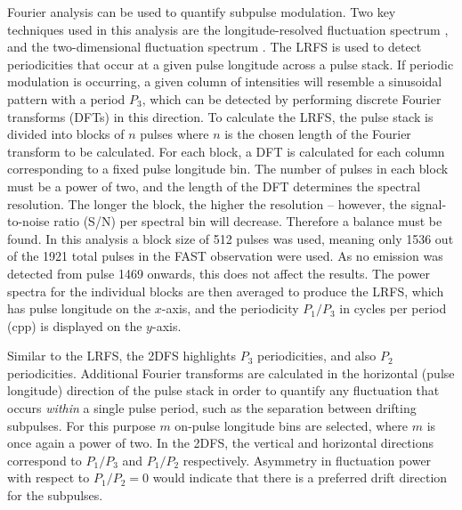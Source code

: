 Fourier analysis can be used to quantify subpulse modulation. Two key techniques used in this analysis are the longitude-resolved fluctuation spectrum \citep[LRFS;][]{Bxxx1970a}, and the two-dimensional fluctuation spectrum \citep[2DFS;][]{ESxx2002}. The LRFS is used to detect periodicities that occur at a given pulse longitude across a pulse stack. If periodic modulation is occurring, a given column of intensities will resemble a sinusoidal pattern with a period $P_3$, which can be detected by performing discrete Fourier transforms (DFTs) in this direction. To calculate the LRFS, the pulse stack is divided into blocks of $n$ pulses where $n$ is the chosen length of the Fourier transform to be calculated. For each block, a DFT is calculated for each column corresponding to a fixed pulse longitude bin. The number of pulses in each block must be a power of two, and the length of the DFT determines the spectral resolution. The longer the block, the higher the resolution -- however, the signal-to-noise ratio (S/N) per spectral bin will decrease. Therefore a balance must be found. In this analysis a block size of 512 pulses was used, meaning only 1536 out of the 1921 total pulses in the FAST observation were used. As no emission was detected from pulse 1469 onwards, this does not affect the results. The power spectra for the individual blocks are then averaged to produce the LRFS, which has pulse longitude on the $x$-axis, and the periodicity $P_1/P_3$ in cycles per period (cpp) is displayed on the $y$-axis. 

Similar to the LRFS, the 2DFS highlights $P_3$ periodicities, and also $P_2$ periodicities. Additional Fourier transforms are calculated in the horizontal (pulse longitude) direction of the pulse stack in order to quantify any fluctuation that occurs \textit{within} a single pulse period, such as the separation between drifting subpulses. For this purpose $m$ on-pulse longitude bins are selected, where $m$ is once again a power of two. In the 2DFS, the vertical and horizontal directions correspond to $P_1/P_3$ and $P_1/P_2$ respectively. Asymmetry in fluctuation power with respect to $P_1/P_2 = 0$ would indicate that there is a preferred drift direction for the subpulses.


